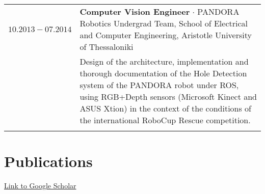 \documentclass[a4paper,10pt,twoside]{article}
\begin{document}
\begin{tabular}{rp{11cm}}
  $10.2013 -07.2014$ & \textbf{Computer Vision Engineer} $\cdot$ PANDORA Robotics Undergrad Team,
School of Electrical and Computer Engineering, Aristotle University of Thessaloniki\\
& \small{Design of the architecture, implementation and thorough documentation of
the Hole Detection system of the PANDORA robot under ROS, using RGB+Depth sensors
(Microsoft Kinect and ASUS Xtion) in the context of the conditions of the international
RoboCup Rescue competition.}\\
\multicolumn{2}{c}{} \\
\end{tabular}


\section{Publications}

\href{https://scholar.google.com/citations?view\_op=list\_works\&hl=en\&user=9\_hI4hMAAAAJ}{Link to Google Scholar}\\

{
\\

\\

\\

\\

\\

\\

\\

\\

\\

\\

\\

}\\
\end{document}
